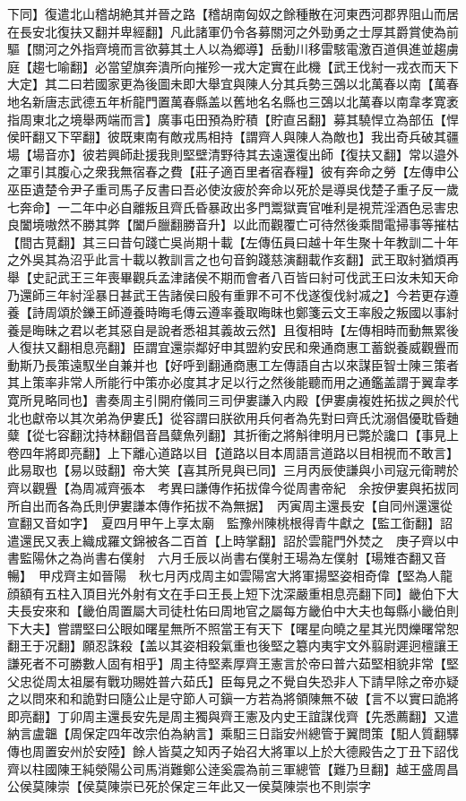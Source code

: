 下同】復遣北山稽胡絶其并晉之路【稽胡南匈奴之餘種散在河東西河郡界阻山而居在長安北復扶又翻并卑經翻】凡此諸軍仍令各募關河之外勁勇之士厚其爵賞使為前驅【關河之外指齊境而言欲募其土人以為郷導】岳動川移雷駭電激百道俱進並趨虜庭【趨七喻翻】必當望旗奔潰所向摧殄一戎大定實在此機【武王伐紂一戎衣而天下大定】其二曰若國家更為後圖未即大舉宜與陳人分其兵勢三鵶以北萬春以南【萬春地名新唐志武德五年析龍門置萬春縣盖以舊地名名縣也三鵶以北萬春以南韋孝寛袤指周東北之境舉两端而言】廣事屯田預為貯積【貯直呂翻】募其驍悍立為部伍【悍侯旰翻又下罕翻】彼既東南有敵戎馬相持【謂齊人與陳人為敵也】我出奇兵破其疆場【場音亦】彼若興師赴援我則堅壁清野待其去遠還復出師【復扶又翻】常以邉外之軍引其腹心之衆我無宿春之費【莊子適百里者宿舂糧】彼有奔命之勞【左傳申公巫臣遺楚令尹子重司馬子反書曰吾必使汝疲於奔命以死於是導吳伐楚子重子反一歲七奔命】一二年中必自離叛且齊氏昏暴政出多門鬻獄賣官唯利是視荒淫酒色忌害忠良闔境嗷然不勝其弊【闔戶臘翻勝音升】以此而觀覆亡可待然後乘間電掃事等摧枯【間古莧翻】其三曰昔句踐亡吳尚期十載【左傳伍員曰越十年生聚十年教訓二十年之外吳其為沼乎此言十載以教訓言之也句音鉤踐慈演翻載作亥翻】武王取紂猶煩再舉【史記武王三年喪畢觀兵孟津諸侯不期而會者八百皆曰紂可伐武王曰汝未知天命乃還師三年紂淫暴日甚武王告諸侯曰殷有重罪不可不伐遂復伐紂㓕之】今若更存遵養【詩周頌於鑠王師遵養時晦毛傳云遵率養取晦昩也鄭箋云文王率殷之叛國以事紂養是晦昧之君以老其惡自是說者悉祖其義故云然】且復相時【左傳相時而動無累後人復扶又翻相息亮翻】臣謂宜還崇鄰好申其盟約安民和衆通商惠工蓄鋭養威觀舋而動斯乃長策遠馭坐自兼并也【好呼到翻通商惠工左傳語自古以來謀臣智士陳三策者其上策率非常人所能行中策亦必度其才足以行之然後能聽而用之通鑑盖謂于翼韋孝寛所見略同也】書奏周主引開府儀同三司伊婁謙入内殿【伊婁虜複姓拓拔之興於代北也獻帝以其次弟為伊婁氏】從容謂曰朕欲用兵何者為先對曰齊氏沈溺倡優耽昏麯糵【從七容翻沈持林翻倡音昌糵魚列翻】其折衝之將斛律明月已斃於讒口【事見上卷四年將即亮翻】上下離心道路以目【道路以目本周語言道路以目相視而不敢言】此易取也【易以豉翻】帝大笑【喜其所見與已同】三月丙辰使謙與小司寇元衛聘於齊以觀舋【為周㓕齊張本　考異曰謙傳作拓拔偉今從周書帝紀　余按伊婁與拓拔同所自出而各為氏則伊婁謙本傳作拓拔不為無据】　丙寅周主還長安【自同州還還從宣翻又音如字】　夏四月甲午上享太廟　監豫州陳桃根得青牛獻之【監工衘翻】詔遣還民又表上織成羅文錦被各二百首【上時掌翻】詔於雲龍門外焚之　庚子齊以中書監陽休之為尚書右僕射　六月壬辰以尚書右僕射王瑒為左僕射【瑒雉杏翻又音暢】　甲戍齊主如晉陽　秋七月丙戍周主如雲陽宮大將軍揚堅姿相奇偉【堅為人龍顔額有五柱入頂目光外射有文在手曰王長上短下沈深嚴重相息亮翻下同】畿伯下大夫長安來和【畿伯周置屬大司徒杜佑曰周地官之屬每方畿伯中大夫也每縣小畿伯則下大夫】嘗謂堅曰公眼如曙星無所不照當王有天下【曙星向曉之星其光閃爍曙常恕翻王于况翻】願忍誅殺【盖以其姿相殺氣重也後堅之簒内夷宇文外翦尉遲迥檀讓王謙死者不可勝數人固有相乎】周主待堅素厚齊王憲言於帝曰普六茹堅相貌非常【堅父忠從周太祖屡有戰功賜姓普六茹氏】臣每見之不覺自失恐非人下請早除之帝亦疑之以問來和和詭對曰隨公止是守節人可鎭一方若為將領陳無不破【言不以實曰詭將即亮翻】丁卯周主還長安先是周主獨與齊王憲及内史王誼謀伐齊【先悉薦翻】又遣納言盧韞【周保定四年改宗伯為納言】乘馹三日詣安州總管于翼問策【馹人質翻驛傳也周置安州於安陸】餘人皆莫之知丙子始召大將軍以上於大德殿告之丁丑下詔伐齊以柱國陳王純滎陽公司馬消難鄭公逹奚震為前三軍總管【難乃旦翻】越王盛周昌公侯莫陳崇【侯莫陳崇已死於保定三年此又一侯莫陳崇也不則崇字